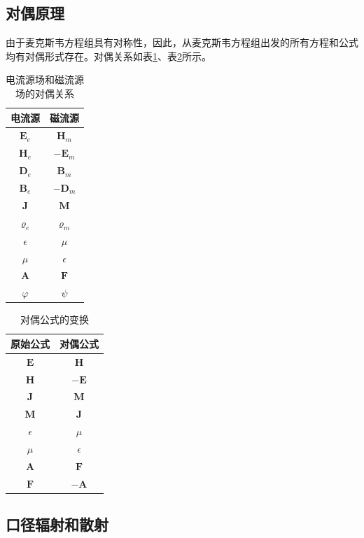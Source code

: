 \documentclass{article}
\numberwithin{equation}{section}
\begin{document}
\subsection{对偶原理}
由于麦克斯韦方程组具有对称性，因此，从麦克斯韦方程组出发的所有方程和公式均有对偶形式存在。对偶关系如表\ref{tab:tab0}、表\ref{tab:tab1}所示。
\begin{table}[!ht]
    \centering
    \caption{电流源场和磁流源场的对偶关系}
    \label{tab:tab0}
    \begin{tabular}{cc}
        \toprule
        电流源 & 磁流源 \\
        \midrule
        $\mathbf{E}_e$ & $\mathbf{H}_m$ \\
        $\mathbf{H}_e$ & $-\mathbf{E}_m$ \\
        $\mathbf{D}_e$ & $\mathbf{B}_m$ \\
        $\mathbf{B}_e$ & $-\mathbf{D}_m$ \\
        $\mathbf{J}$ & $\mathbf{M}$ \\
        $\varrho_e$ & $\varrho_m$ \\
        $\epsilon$ & $\mu$ \\
        $\mu$ & $\epsilon$ \\
        $\mathbf{A}$ & $\mathbf{F}$ \\
        $\varphi$ & $\psi$ \\
        \bottomrule
     \end{tabular}
\end{table}
\begin{table}[!ht]
    \centering
    \caption{对偶公式的变换}
    \label{tab:tab1}
    \begin{tabular}{cc}
        \toprule
        原始公式 & 对偶公式 \\
        \midrule
        $\mathbf{E}$ & $\mathbf{H}$ \\
        $\mathbf{H}$ & $-\mathbf{E}$ \\
        $\mathbf{J}$ & $\mathbf{M}$ \\
        $\mathbf{M}$ & $\mathbf{J}$ \\
        $\epsilon$ & $\mu$ \\
        $\mu$ & $\epsilon$ \\
        $\mathbf{A}$ & $\mathbf{F}$ \\
        $\mathbf{F}$ & $-\mathbf{A}$ \\
        \bottomrule
     \end{tabular}
\end{table}
\subsection{口径辐射和散射}
\end{document}
